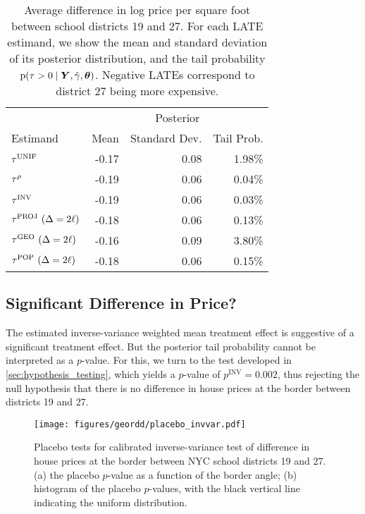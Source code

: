 \begin{table}
    \centering
    \begin{tabular}{lrrr}
        \hline
        & \multicolumn{3}{c}{Posterior} \\
        Estimand & Mean & Standard Dev. & Tail Prob. \\
        \hline
          \(\tau^{\mathrm{UNIF}}\) & -0.17 & 0.08 & 1.98\% \\
          \(\tau^{\rho}\) & -0.19 & 0.06 & 0.04\% \\
          \(\tau^{\mathrm{INV}}\) & -0.19 & 0.06 & 0.03\% \\
          \(\tau^{\mathrm{PROJ}}~(\Delta=2\ell)\) & -0.18 & 0.06 & 0.13\% \\
          \(\tau^{\mathrm{GEO}}~(\Delta=2\ell)\) & -0.16 & 0.09 & 3.80\% \\
          \(\tau^{\mathrm{POP}}~(\Delta=2\ell)\) & -0.18 & 0.06 & 0.15\% \\
        \hline
    \end{tabular}
    \caption{
    \label{table:NYC_ate}
Average difference in log price per square foot between school districts 19 and 27. For each LATE estimand, we show the mean and standard deviation of its posterior distribution, and the tail probability \(\operatorname{p}(\tau > 0 \mid \bm{Y}, \hat{\gamma}, \bm{\theta})\). 
Negative LATEs correspond to district 27 being more expensive.
}
\end{table}

\subsection{Significant Difference in Price?}
The estimated inverse-variance weighted mean treatment effect is suggestive of a significant treatment effect.
But the posterior tail probability cannot be interpreted as a \(p\)-value.
For this, we turn to the test developed in \autoref{sec:hypothesis_testing}, which yields a \(p\)-value of \(p^{\mathrm{INV}}=0.002\), thus rejecting the null hypothesis that there is no difference in house prices at the border between districts 19 and 27.

\begin{figure}[tb]
    \centering
    \texttt{[image: figures/geordd/placebo\_invvar.pdf]}
    \caption{
    \label{fig:placebo_invvar} Placebo tests for calibrated inverse-variance test of difference in house prices at the border between NYC school districts 19 and 27. 
    (a) the placebo \(p\)-value as a function of the border angle;
    (b) histogram of the placebo \(p\)-values, 
    with the black vertical line indicating the uniform distribution.
    }
\end{figure}

